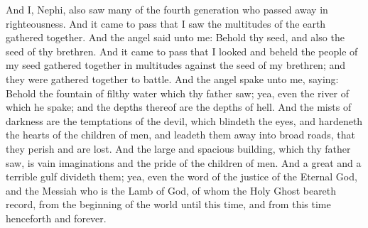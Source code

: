 \bverse \iffalse And I, Nephi, also saw many of the fourth generation who passed away in righteousness. \fi
And I, Nephi, also saw many of the fourth generation who passed away in righteousness.
\bverse \iffalse And it came to pass that I saw the multitudes of the earth gathered together. \fi
And it came to pass that I saw the multitudes of the earth gathered together.
\bverse \iffalse And the angel said unto me: Behold thy seed, and also the seed of thy brethren. \fi
And the angel said unto me: Behold thy seed, and also the seed of thy brethren.
\bverse \iffalse And it came to pass that I looked and beheld the people of my seed gathered together in multitudes against the seed of my brethren; and they were gathered together to battle. \fi
And it came to pass that I looked and beheld the people of my seed gathered together in multitudes against the seed of my brethren; and they were gathered together to battle.
\bverse \iffalse And the angel spake unto me, saying: Behold the fountain of filthy water which thy father saw; yea, even the river of which he spake; and the depths thereof are the depths of hell. \fi
And the angel spake unto me, saying: Behold the fountain of filthy water which thy father saw; yea, even the river of which he spake; and the depths thereof are the depths of hell.
\bverse \iffalse And the mists of darkness are the temptations of the devil, which blindeth the eyes, and hardeneth the hearts of the children of men, and leadeth them away into broad roads, that they perish and are lost. \fi
And the mists of darkness are the temptations of the devil, which blindeth the eyes, and hardeneth the hearts of the children of men, and leadeth them away into broad roads, that they perish and are lost.
\bverse \iffalse And the large and spacious building, which thy father saw, is vain imaginations and the pride of the children of men. And a great and a terrible gulf divideth them; yea, even the word of the justice of the Eternal God, and the Messiah who is the Lamb of God, of whom the Holy Ghost beareth record, from the beginning of the world until this time, and from this time henceforth and forever. \fi
And the large and spacious building, which thy father saw, is vain imaginations and the pride of the children of men. And a great and a terrible gulf divideth them; yea, even the word of the justice of the Eternal God, and the Messiah who is the Lamb of God, of whom the Holy Ghost beareth record, from the beginning of the world until this time, and from this time henceforth and forever.
